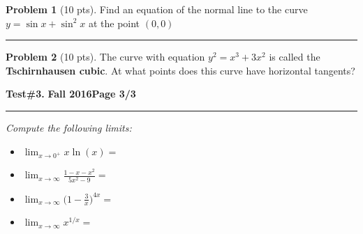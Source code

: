 \documentclass[12pt]{article}
\theoremstyle{definition}
\newtheorem{problem}{Problem}
\begin{document}
\begin{problem}[10 pts]
Find an equation of the normal line to the curve $y=\sin x + \sin^2 x$ at the point $(0,0)$

\vspace{4cm}

\begin{flushright}
\end{flushright}
\end{problem}
\hrule

\begin{problem}[10 pts]
The curve with equation $y^2=x^3+3x^2$ is called the \textbf{Tschirnhausen cubic}.  At what points does this curve have horizontal tangents?

\vspace{5cm}

\begin{flushright}
\end{flushright}
\end{problem}
\newpage

\hfill{\large\bf Test\#3.}\hfill{\large\bf
  Fall 2016}\hfill{\large\bf Page 3/3}\hrule

\bigskip
{\problem \em Compute the following limits:}
\begin{itemize}
  \item[] [10 pts] $\displaystyle{\lim_{x\to 0^+} x \ln (x)} =$ \framebox[2cm][c]{\textcolor{white}{$\bigg ( $}}
  \vspace{3cm}
  \item[] [10 pts] $\displaystyle{\lim_{x\to\infty} \frac{1-x-x^2}{5x^2-9}} = $ \framebox[2cm][c]{\textcolor{white}{$\bigg ( $}}
  \vspace{3cm}
  \item[] [10 pts] $\displaystyle{\lim_{x\to\infty} \Big(1-\frac{3}{x} \Big)^{4x}} = $ \framebox[2cm][c]{\textcolor{white}{$\bigg ( $}}
  \vspace{6cm}
  \item[] [10 pts] $\displaystyle{\lim_{x\to\infty} x^{1/x}} = $ \framebox[2cm][c]{\textcolor{white}{$\bigg ( $}}
\end{itemize}
\end{document}
